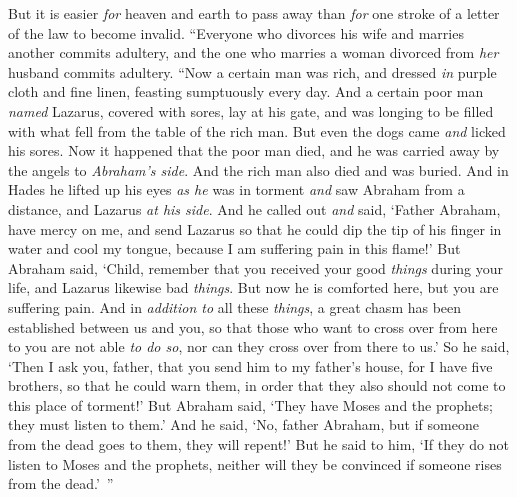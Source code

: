 \begin{biblechapter}
\verse But it is easier \textit{for} heaven and earth to pass away than \textit{for} one stroke of a letter of the law to become invalid.
 “Everyone who divorces his wife and marries another commits adultery, and the one who marries a woman divorced from \textit{her} husband commits adultery.
 “Now a certain man was rich, and dressed \textit{in} purple cloth and fine linen, feasting sumptuously every day.
\verse And a certain poor man \textit{named} Lazarus, covered with sores, lay at his gate,
\verse and was longing to be filled with what fell from the table of the rich man. But even the dogs came \textit{and} licked his sores.
\verse Now it happened that the poor man died, and he was carried away by the angels to \textit{Abraham’s side}. And the rich man also died and was buried.
\verse And in Hades he lifted up his eyes \textit{as he} was in torment \textit{and} saw Abraham from a distance, and Lazarus \textit{at his side}.
\verse And he called out \textit{and} said, ‘Father Abraham, have mercy on me, and send Lazarus so that he could dip the tip of his finger in water and cool my tongue, because I am suffering pain in this flame!’
\verse But Abraham said, ‘Child, remember that you received your good \textit{things} during your life, and Lazarus likewise bad \textit{things}. But now he is comforted here, but you are suffering pain.
\verse And in \textit{addition to} all these \textit{things}, a great chasm has been established between us and you, so that those who want to cross over from here to you are not able \textit{to do so}, nor can they cross over from there to us.’
\verse So he said, ‘Then I ask you, father, that you send him to my father’s house,
\verse for I have five brothers, so that he could warn them, in order that they also should not come to this place of torment!’
\verse But Abraham said, ‘They have Moses and the prophets; they must listen to them.’
\verse And he said, ‘No, father Abraham, but if someone from the dead goes to them, they will repent!’
\verse But he said to him, ‘If they do not listen to Moses and the prophets, neither will they be convinced if someone rises from the dead.’ ”
\end{biblechapter}

